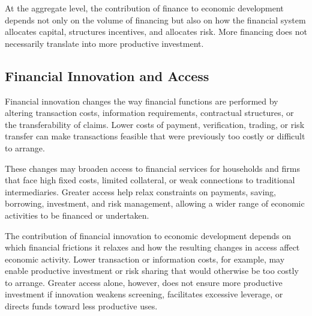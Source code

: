 At the aggregate level, the contribution of finance to economic development depends not only on the volume of financing but also on how the financial system allocates capital, structures incentives, and allocates risk. More financing does not necessarily translate into more productive investment.

\subsection{Financial Innovation and Access}

Financial innovation changes the way financial functions are performed by altering transaction costs, information requirements, contractual structures, or the transferability of claims. Lower costs of payment, verification, trading, or risk transfer can make transactions feasible that were previously too costly or difficult to arrange.

These changes may broaden access to financial services for households and firms that face high fixed costs, limited collateral, or weak connections to traditional intermediaries. Greater access help relax constraints on payments, saving, borrowing, investment, and risk management, allowing a wider range of economic activities to be financed or undertaken.

The contribution of financial innovation to economic development depends on which financial frictions it relaxes and how the resulting changes in access affect economic activity. Lower transaction or information costs, for example, may enable productive investment or risk sharing that would otherwise be too costly to arrange. Greater access alone, however, does not ensure more productive investment if innovation weakens screening, facilitates excessive leverage, or directs funds toward less productive uses.



